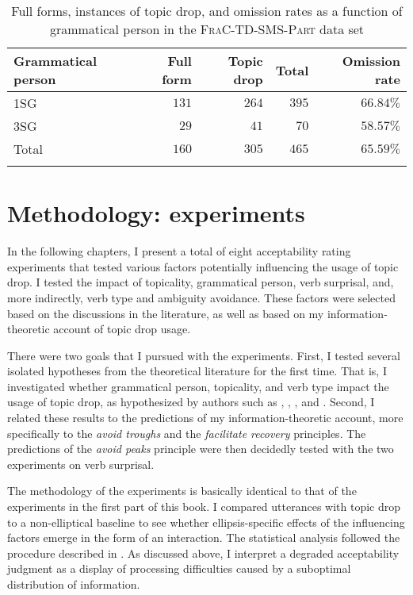 \begin{table}
\centering
\caption{Full forms, instances of topic drop, and omission rates as a function of grammatical person in the \textsc{FraC-TD-SMS-Part} data set}
\begin{tabular}{lrrrr}
\lsptoprule
Grammatical person & Full form & Topic drop & Total & Omission rate\\
\midrule
1SG & $131$ & $264$ & $395$ & $66.84\%$\\
3SG & $29$ & $41$ & $70$ & $58.57\%$\\
\tablevspace
Total & $160$ & $305$ & $465$ & $65.59\%$\\
\lspbottomrule
\end{tabular}
\label{tab:frac.td.mess.part}
\end{table}

\section{Methodology: experiments }
\label{sec:experiments}
In the following chapters, I present a total of eight acceptability rating experiments that tested various factors potentially influencing the usage of topic drop.
I tested the impact of topicality, grammatical person, verb surprisal, and, more indirectly, verb type and ambiguity avoidance.
These factors were selected based on the discussions in the literature, as well as based on my information-theoretic account of topic drop usage.

There were two goals that I pursued with the experiments.
First, I tested several isolated hypotheses from the theoretical literature for the first time.
That is, I investigated whether grammatical person, topicality, and verb type impact the usage of topic drop, as hypothesized by authors such as \citet{auer1993}, \citet{zifonun.etal1997}, \citet{imo2013}, and \citet{helmer2016}.
Second, I related these results to the predictions of my information-theoretic account, more specifically to the \textit{avoid troughs} and the \textit{facilitate recovery} principles. 
The predictions of the \textit{avoid peaks} principle were then decidedly tested with the two experiments on verb surprisal.

The methodology of the experiments is basically identical to that of the experiments in the first part of this book.
I compared utterances with topic drop to a non-elliptical baseline to see whether ellipsis-specific effects of the influencing factors emerge in the form of an interaction.
The statistical analysis followed the procedure described in .
As discussed above, I interpret a degraded acceptability judgment as a display of processing difficulties  caused by a suboptimal distribution of information. 
